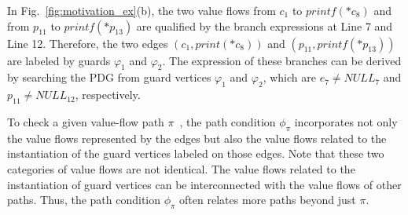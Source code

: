 
\begin{example}
    In Fig.~\ref{fig:motivation_ex}(b), the two value flows from $c_1$ to $printf(*c_8)$ and from $p_{11}$ to $printf(*p_{13})$ are qualified by the branch expressions at Line 7 and Line 12. 
    Therefore, the two edges $(c_1, print(*c_8))$ and $(p_{11}, printf(*p_{13}))$ are labeled by guards $\varphi_1$ and $\varphi_2$. 
    The expression of these branches can be derived by searching the PDG from guard vertices $\varphi_1$ and $\varphi_2$, which are $e_7 \neq NULL_{7}$ and $p_{11} \neq NULL_{12}$, respectively.
    \label{example:pdg}
\end{example}


To check a given value-flow path $\pi$~\cite{shi2018pinpoint}, the path condition $\phi_{\pi}$ incorporates not only the value flows represented by the edges but also the value flows related to the instantiation of the guard vertices labeled on those edges. 
Note that these two categories of value flows are not identical. The value flows related to the instantiation of guard vertices can be interconnected with the value flows of other paths. Thus, the path condition $\phi_{\pi}$ often relates more paths beyond just $\pi$.



